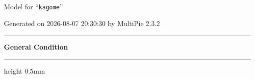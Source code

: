 \documentclass[fleqn,10pt,landscape]{jsarticle}
\begin{document}
\setcounter{MaxMatrixCols}{32}

\renewcommand{\tablename}{Table~}
\renewcommand{\figurename}{Figure~}
\setlength{\baselineskip}{16pt}
\setlength{\parindent}{0pt}
\setlength{\mathindent}{0pt}
\footnotesize
\begin{center}
\LARGE
Model for ``\texttt{kagome}''
\end{center}
\begin{flushright}
Generated on 2026-08-07 20:30:30 by MultiPie 2.3.2
\end{flushright}
\setlength{\baselineskip}{16pt}
\footnotesize
\vspace{5mm}
\noindent \rule[0.5mm]{5mm}{0.5mm}\hspace{3mm}\textbf{General Condition}\hspace{3mm}\leaders\hrule height 0.5mm\hfill\kern0pt
\vspace{3mm}
\end{document}
